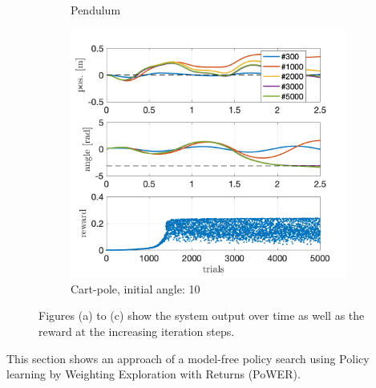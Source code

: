 \documentclass[letterpaper, 10 pt, conference]{ieeeconf}  %
\begin{document}
\begin{figure}[!thp]
\begin{subfigure}{0.325\textwidth}
	\caption{Pendulum \newline}\label{fig:PoWER_pendulum}
	\end{subfigure}
	\begin{subfigure}{0.325\textwidth}
	\includegraphics[width=\textwidth]{julia_cp10_quad.png}
	\caption{Cart-pole, initial angle: 10\textdegree}\label{fig:PoWER_cp}
	\end{subfigure}\caption{Figures (a) to (c) show the system output over time as well as the reward at the increasing iteration steps.}\label{fig:PoWER}
\end{figure} 
This section shows an approach of a model-free policy search using Policy learning by Weighting Exploration with Returns (PoWER).
\end{document}
